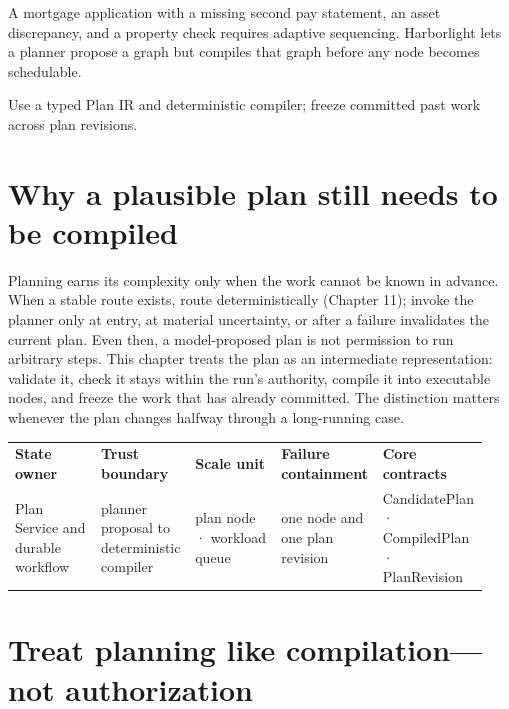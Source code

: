 \begin{bookcallout}
A mortgage application with a missing second pay statement, an asset discrepancy, and a property check requires adaptive sequencing. Harborlight lets a planner propose a graph but compiles that graph before any node becomes schedulable.
\end{bookcallout}

\begin{bookcallout}
Use a typed Plan IR and deterministic compiler; freeze committed past work across plan revisions.
\end{bookcallout}

\section{Why a plausible plan still needs to be compiled}

Planning earns its complexity only when the work cannot be known in advance. When a stable route exists, route deterministically (Chapter 11); invoke the planner only at entry, at material uncertainty, or after a failure invalidates the current plan. Even then, a model-proposed plan is not permission to run arbitrary steps. This chapter treats the plan as an intermediate representation: validate it, check it stays within the run's authority, compile it into executable nodes, and freeze the work that has already committed. The distinction matters whenever the plan changes halfway through a long-running case.\par

\BookTableStart
\fontsize{7.2}{9}\selectfont
\begin{tabular}{@{}Y{0.1880\linewidth}Y{0.1880\linewidth}Y{0.1880\linewidth}Y{0.1880\linewidth}Y{0.1880\linewidth}@{}}
\color{white}\bfseries \textbf{State owner} & \color{white}\bfseries \textbf{Trust boundary} & \color{white}\bfseries \textbf{Scale unit} & \color{white}\bfseries \textbf{Failure containment} & \color{white}\bfseries \textbf{Core contracts} \\
Plan Service and durable workflow & planner proposal to deterministic compiler & plan node · workload queue & one node and one plan revision & CandidatePlan · CompiledPlan · PlanRevision \\
\end{tabular}
\BookTableEnd

\section{Treat planning like compilation—not authorization}

